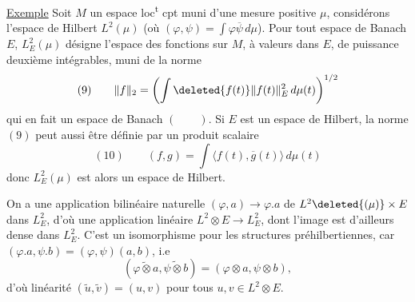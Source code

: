 

\uline{Exemple} Soit $M$ un espace loc\textsuperscript{t} cpt muni d'une
mesure positive $\mu$, considérons l'espace de Hilbert
$L^2(\mu)$ (où $(\varphi,\psi)=\int\varphi\overline\psi\,d\mu$).
Pour tout espace de Banach $E$, $L^2_E(\mu)$ désigne l'espace des
fonctions sur $M$, à valeurs dans $E$, de puissance deuxième
intégrables, muni de la norme
\[
(9)\qquad
\|f\|_2=\left(\int \deleted{f(t)}\|f(t)\|_E^2\,d\mu(t)\right)^{1/2}
\]
qui en fait un espace de Banach $(\qquad)$. Si
$E$ est un espace de Hilbert, la norme $(9)$ peut
aussi être définie par un produit scalaire
\[
(10)\qquad (f,g)=\int\langle f(t),\overline g(t)\rangle\,d\mu(t)
\]
donc $L^2_E(\mu)$ est alors un espace de Hilbert.

On a une application bilinéaire naturelle
$(\varphi,a)\longrightarrow\varphi.a$ de $L^2\deleted{(\mu)}\times E$ dans $L^2_E$,
d'où une application linéaire 
$L^2\otimes E\longrightarrow L^2_E$, dont
l'image est d'ailleurs dense dans $L^2_E$. 
 C'est un isomorphisme pour les structures
préhilbertiennes, car 
$(\varphi.a,\psi.b)=(\varphi,\psi)(a,b)$,
i.e
\[
(\widetilde{\varphi\otimes a},\widetilde{\psi\otimes b})
=(\varphi\otimes a,\psi\otimes b),
\]
d'où linéarité $(\widetilde u,\widetilde v)=(u,v)$
pour tous $u,v\in L^2\otimes E$.
